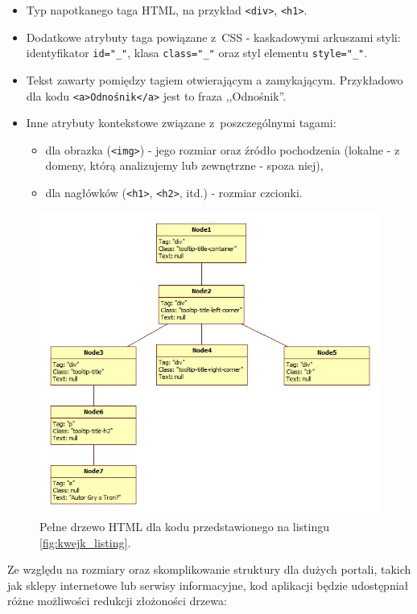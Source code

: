 \documentclass[a4paper,10pt]{article}
\begin{document}
\begin{itemize}
 \item Typ napotkanego taga HTML, na przykład \verb+<div>+, \verb+<h1>+.
 \item Dodatkowe atrybuty taga powiązane z~CSS - kaskadowymi arkuszami styli: identyfikator \verb+id="_"+, klasa \verb+class="_"+ oraz styl elementu \verb+style="_"+.
 \item Tekst zawarty pomiędzy tagiem otwierającym a zamykającym. Przykładowo dla kodu \verb+<a>Odnośnik</a>+ jest to fraza ,,Odnośnik''.
 \item Inne atrybuty kontekstowe związane z~poszczególnymi tagami:
 
    \begin{itemize}
      \item dla obrazka (\verb+<img>+) - jego rozmiar oraz źródło pochodzenia (lokalne - z domeny, którą analizujemy lub zewnętrzne - spoza niej),
      \item dla nagłówków (\verb+<h1>+, \verb+<h2>+, itd.) - rozmiar czcionki.
    \end{itemize}
\end{itemize}

\begin{figure}[h!]
\centering
  \includegraphics[width=.9\textwidth]{html_tree_full.jpg}
  \caption{Pełne drzewo HTML dla kodu przedstawionego na listingu \ref{fig:kwejk_listing}.}
  \label{fig:html_tree_full}
\end{figure}

Ze względu na rozmiary oraz skomplikowanie struktury dla dużych portali, takich jak sklepy internetowe lub serwisy informacyjne, kod aplikacji będzie udostępniał różne możliwości redukcji złożoności drzewa:
\end{document}
